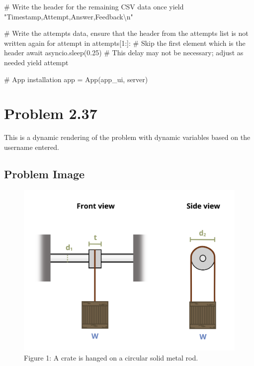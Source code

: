 \documentclass[
  letterpaper,
  DIV=11,
  numbers=noendperiod]{scrreprt}
\newenvironment{Shaded}{\begin{snugshade}}{\end{snugshade}}
\newcommand{\NormalTok}[1]{\textcolor[rgb]{0.00,0.23,0.31}{#1}}
\begin{document}
\begin{Shaded}
\begin{Highlighting}[]
\NormalTok{        \# Write the header for the remaining CSV data once}
\NormalTok{        yield "Timestamp,Attempt,Answer,Feedback\textbackslash{}n"}
        
\NormalTok{        \# Write the attempts data, ensure that the header from the attempts list is not written again}
\NormalTok{        for attempt in attempts[1:]:  \# Skip the first element which is the header}
\NormalTok{            await asyncio.sleep(0.25)  \# This delay may not be necessary; adjust as needed}
\NormalTok{            yield attempt}


\NormalTok{\# App installation}
\NormalTok{app = App(app\_ui, server)}
\end{Highlighting}
\end{Shaded}

\chapter*{Problem 2.37}\label{problem-2.37}


This is a dynamic rendering of the problem with dynamic variables based
on the username entered.

\section*{Problem Image}\label{problem-image-10}


\begin{figure}[H]

{\centering \includegraphics{images/166.png}

}

\caption{Figure 1: A crate is hanged on a circular solid metal rod.}

\end{figure}%
\end{document}
